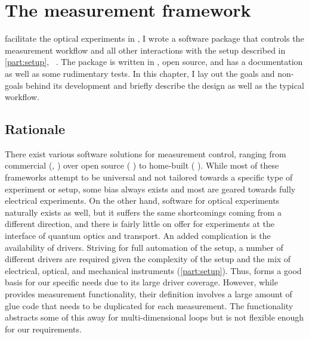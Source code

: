 \chapter{The \mjolnir measurement framework}\label{ch:exp:mjolnir}
 facilitate the optical experiments in \thispart, I wrote a software package that controls the measurement workflow and all other interactions with the setup described in \cref{part:setup}, ~\cite{Hangleiter_mjolnir}.
The package is written in \python, open source, and has a documentation as well as some rudimentary tests.
In this chapter, I lay out the goals and non-goals behind its development and briefly describe the design as well as the typical workflow.

\section{Rationale}\label{sec:exp:mjolnir:rationale}
There exist various software solutions for measurement control, ranging from commercial (\eg, ) over open source ( ) to home-built ( ).
While most of these frameworks attempt to be universal and not tailored towards a specific type of experiment or setup, some bias always exists and most are geared towards fully electrical experiments.
On the other hand, software for optical experiments naturally exists as well, but it suffers the same shortcomings coming from a different direction, and there is fairly little on offer for experiments at the interface of quantum optics and transport.
An added complication is the availability of drivers.
Striving for full automation of the setup, a number of different drivers are required given the complexity of the setup and the mix of electrical, optical, and mechanical instruments (\cref{part:setup}).
Thus, \qcodes forms a good basis for our specific needs due to its large driver coverage.
However, while \qcodes provides measurement functionality, their definition involves a large amount of glue code that needs to be duplicated for each measurement.
The  functionality abstracts some of this away for multi-dimensional loops but is not flexible enough for our requirements.

